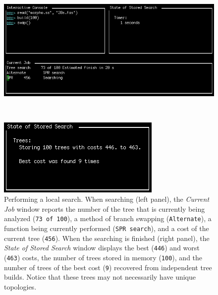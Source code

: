 {\begin{figure}
\centering
\begin{minipage}[c]{0.49\textwidth}
   		\includegraphics[width=\textwidth]{doc/figures/swap1.jpg}
\end{minipage}
\,
\begin{minipage}[c]{0.453\textwidth}
	   	\includegraphics[width=\textwidth]{doc/figures/swap2.jpg}
   	\end{minipage}
\caption{Performing a local search. When searching (left panel), the \emph{Current Job} window reports the number 
of the tree that is currently being analyzed (\texttt{73 of 100}), a method of branch swapping (\texttt{Alternate}), a 
function being currently performed (\texttt{SPR search}), and a cost of the current tree (\texttt{456}). When the 
searching is finished (right panel), the \emph{State of Stored Search} window displays the best (\texttt{446}) and 
worst (\texttt{463}) costs, the number of trees stored in memory (\texttt{100}), and the number of trees of the best 
cost (\texttt{9}) recovered from independent tree builds. Notice that these trees may not necessarily have unique topologies.} 
\label{fig:swapping}
\end{figure}

}
